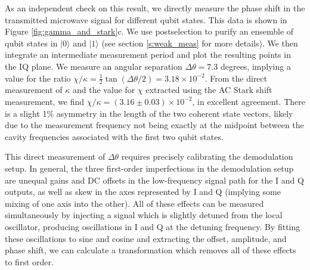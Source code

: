 As an independent check on this result, we directly measure the phase shift in the transmitted microwave signal for different qubit states.  This data is shown in Figure \ref{fig:gamma_and_stark}c.  We use postselection to purify an ensemble of qubit states in $|0\rangle$ and $|1\rangle$ (see section \ref{s:weak_meas} for more details).  We then integrate an intermediate measurement period and plot the resulting points in the IQ plane.  We measure an angular separation $\Delta \theta = 7.3$ degrees, implying a value for the ratio $\chi / \kappa = \frac{1}{2} \tan{(\Delta \theta/2)} = 3.18 \times 10^{-2}$.  From the direct measurement of $\kappa$ and the value for $\chi$ extracted using the AC Stark shift measurement, we find $\chi / \kappa = (3.16 \pm 0.03) \times 10^{-2}$, in excellent agreement.  There is a slight 1\% asymmetry in the length of the two coherent state vectors, likely due to the measurement frequency not being exactly at the midpoint between the cavity frequencies associated with the first two qubit states.

This direct measurement of $\Delta \theta$ requires precisely calibrating the demodulation setup.  In general, the three first-order imperfections in the demodulation setup are unequal gains and DC offsets in the low-frequency signal path for the I and Q outputs, as well as skew in the axes represented by I and Q (implying some mixing of one axis into the other).  All of these effects can be measured simultaneously by injecting a signal which is slightly detuned from the local oscillator, producing oscillations in I and Q at the detuning frequency.  By fitting these oscillations to sine and cosine and extracting the offset, amplitude, and phase shift, we can calculate a transformation which removes all of these effects to first order. 

